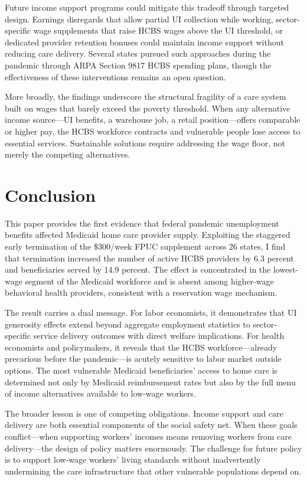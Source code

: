 \documentclass[12pt]{article}
\begin{document}
Future income support programs could mitigate this tradeoff through targeted design. Earnings disregards that allow partial UI collection while working, sector-specific wage supplements that raise HCBS wages above the UI threshold, or dedicated provider retention bonuses could maintain income support without reducing care delivery. Several states pursued such approaches during the pandemic through ARPA Section 9817 HCBS spending plans, though the effectiveness of these interventions remains an open question.

More broadly, the findings underscore the structural fragility of a care system built on wages that barely exceed the poverty threshold. When any alternative income source---UI benefits, a warehouse job, a retail position---offers comparable or higher pay, the HCBS workforce contracts and vulnerable people lose access to essential services. Sustainable solutions require addressing the wage floor, not merely the competing alternatives.


\section{Conclusion}

This paper provides the first evidence that federal pandemic unemployment benefits affected Medicaid home care provider supply. Exploiting the staggered early termination of the \$300/week FPUC supplement across 26 states, I find that termination increased the number of active HCBS providers by 6.3 percent and beneficiaries served by 14.9 percent. The effect is concentrated in the lowest-wage segment of the Medicaid workforce and is absent among higher-wage behavioral health providers, consistent with a reservation wage mechanism.

The result carries a dual message. For labor economists, it demonstrates that UI generosity effects extend beyond aggregate employment statistics to sector-specific service delivery outcomes with direct welfare implications. For health economists and policymakers, it reveals that the HCBS workforce---already precarious before the pandemic---is acutely sensitive to labor market outside options. The most vulnerable Medicaid beneficiaries' access to home care is determined not only by Medicaid reimbursement rates but also by the full menu of income alternatives available to low-wage workers.

The broader lesson is one of competing obligations. Income support and care delivery are both essential components of the social safety net. When these goals conflict---when supporting workers' incomes means removing workers from care delivery---the design of policy matters enormously. The challenge for future policy is to support low-wage workers' living standards without inadvertently undermining the care infrastructure that other vulnerable populations depend on.
\end{document}

